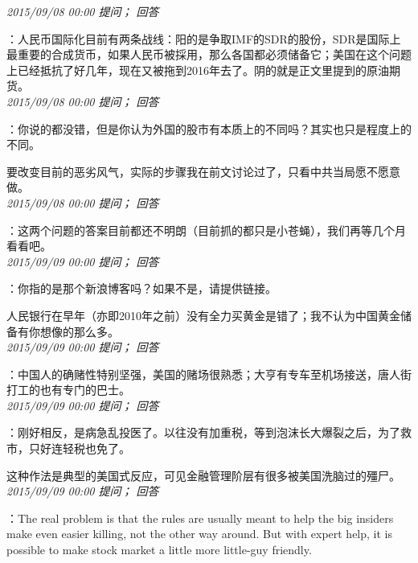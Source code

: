 \documentclass[twocolumn]{ctexart}
\begin{document}
\textit{\hfill\noindent\small 2015/09/08 00:00 提问； 回答}

：人民币国际化目前有两条战线：阳的是争取IMF的SDR的股份，SDR是国际上最重要的合成货币，如果人民币被採用，那么各国都必须储备它；美国在这个问题上已经抵抗了好几年，现在又被拖到2016年去了。阴的就是正文里提到的原油期货。\\

\textit{\hfill\noindent\small 2015/09/08 00:00 提问； 回答}

：你说的都没错，但是你认为外国的股市有本质上的不同吗？其实也只是程度上的不同。

要改变目前的恶劣风气，实际的步骤我在前文讨论过了，只看中共当局愿不愿意做。\\

\textit{\hfill\noindent\small 2015/09/08 00:00 提问； 回答}

：这两个问题的答案目前都还不明朗（目前抓的都只是小苍蝇），我们再等几个月看看吧。\\

\textit{\hfill\noindent\small 2015/09/09 00:00 提问； 回答}

：你指的是那个新浪博客吗？如果不是，请提供链接。

人民银行在早年（亦即2010年之前）没有全力买黄金是错了；我不认为中国黄金储备有你想像的那么多。\\

\textit{\hfill\noindent\small 2015/09/09 00:00 提问； 回答}

：中国人的确赌性特别坚强，美国的赌场很熟悉；大亨有专车至机场接送，唐人街打工的也有专门的巴士。\\

\textit{\hfill\noindent\small 2015/09/09 00:00 提问； 回答}

：刚好相反，是病急乱投医了。以往没有加重税，等到泡沫长大爆裂之后，为了救市，只好连轻税也免了。

这种作法是典型的美国式反应，可见金融管理阶层有很多被美国洗脑过的殭尸。\\

\textit{\hfill\noindent\small 2015/09/09 00:00 提问； 回答}

：The real problem is that the rules are usually meant to help the big insiders make even easier killing, not the other way around. But with expert help, it is possible to make stock market a little more little-guy friendly.\\
\end{document}
